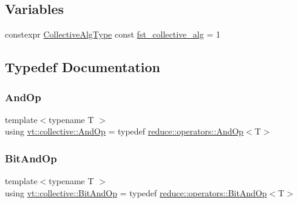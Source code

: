 \subsection*{Variables}
\begin{DoxyCompactItemize}
\item 
constexpr \hyperlink{namespacevt_a5ffcf8e168b77b0f36e11b616049a1cf}{Collective\+Alg\+Type} const \hyperlink{namespacevt_1_1collective_a162001be7dbe7f94163297a57f6b53e8}{fst\+\_\+collective\+\_\+alg} = 1
\end{DoxyCompactItemize}


\subsection{Typedef Documentation}
\mbox{\label{namespacevt_1_1collective_ae6f54eb36ce2d4203174e55167c4cd87}} 
\subsubsection{\texorpdfstring{And\+Op}{AndOp}}
{\footnotesize\ttfamily template$<$typename T $>$ \\
using \hyperlink{namespacevt_1_1collective_ae6f54eb36ce2d4203174e55167c4cd87}{vt\+::collective\+::\+And\+Op} = typedef \hyperlink{structvt_1_1collective_1_1reduce_1_1operators_1_1_and_op}{reduce\+::operators\+::\+And\+Op}$<$T$>$}

\mbox{\label{namespacevt_1_1collective_a64c800cae2fcb4ec24d2c5540cca0f9e}} 
\subsubsection{\texorpdfstring{Bit\+And\+Op}{BitAndOp}}
{\footnotesize\ttfamily template$<$typename T $>$ \\
using \hyperlink{namespacevt_1_1collective_a64c800cae2fcb4ec24d2c5540cca0f9e}{vt\+::collective\+::\+Bit\+And\+Op} = typedef \hyperlink{structvt_1_1collective_1_1reduce_1_1operators_1_1_bit_and_op}{reduce\+::operators\+::\+Bit\+And\+Op}$<$T$>$}

\mbox{\label{namespacevt_1_1collective_a07085d466f47337de6f1d6ea30023c11}} 
